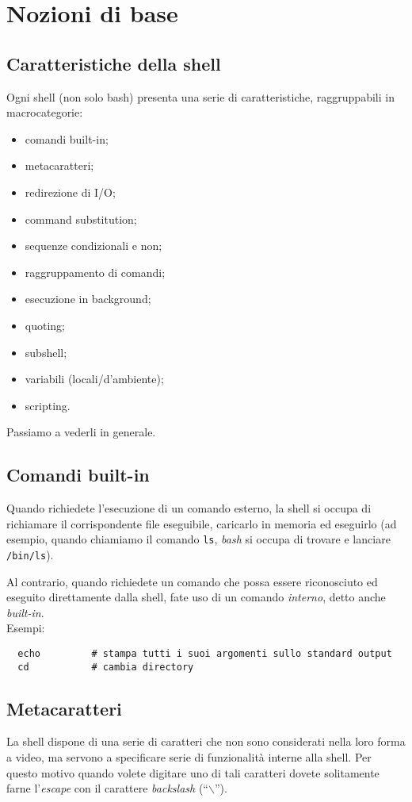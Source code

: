 \chapter{Nozioni di base}

\section{Caratteristiche della shell}
Ogni shell (non solo bash) presenta una serie di caratteristiche, raggruppabili in macrocategorie:
\begin{itemize}
	\item comandi built-in;
	\item metacaratteri;
	\item redirezione di I/O;
	\item command substitution;
	\item sequenze condizionali e non;
	\item raggruppamento di comandi;
	\item esecuzione in background;
	\item quoting;
	\item subshell;
	\item variabili (locali/d'ambiente);
	\item scripting.
\end{itemize}
Passiamo a vederli in generale.

\section{Comandi built-in}
Quando richiedete l'esecuzione di un comando esterno, la shell si
occupa di richiamare il corrispondente file eseguibile, caricarlo in memoria
ed eseguirlo (ad esempio, quando chiamiamo il comando \texttt{ls},
\textit{bash} si occupa di trovare e lanciare \texttt{/bin/ls}).

Al contrario, quando richiedete un comando che possa essere riconosciuto ed
eseguito direttamente dalla shell, fate uso di un comando \textit{interno},
detto anche \textit{built-in}.\\
Esempi:
\begin{verbatim}
  echo         # stampa tutti i suoi argomenti sullo standard output
  cd           # cambia directory
\end{verbatim}

\section{Metacaratteri}
La shell dispone di una serie di caratteri che non sono considerati nella loro
forma a video, ma servono a specificare serie di funzionalit\`a interne alla
shell. Per questo motivo quando volete digitare uno di tali caratteri dovete
solitamente farne l'\textit{escape} con il carattere \textit{backslash}
(``$\backslash$'').

